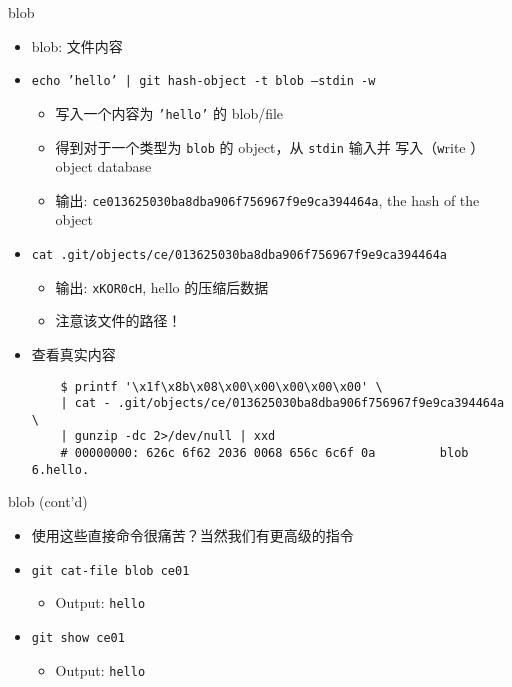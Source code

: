 \documentclass[aspectratio=169]{beamer}
\newcommand{\T}[1]{\texttt{#1}}
\begin{document}
\begin{frame}[fragile]{blob}
  \begin{itemize}
    \item<1-> blob: 文件内容
    \item<2-> \T{echo 'hello' | git hash-object -t blob --stdin -w}\begin{itemize}
      \item 写入一个内容为 \T{'hello'} 的 blob/file
      \item 得到对于一个类型为 \T{blob} 的 object，从 \T{stdin} 输入并 写入（\T{w}rite ） object database
      \item 输出: \T{ce013625030ba8dba906f756967f9e9ca394464a}, the hash of the object
    \end{itemize}
    \item<3-> \T{cat .git/objects/ce/013625030ba8dba906f756967f9e9ca394464a}\begin{itemize}
      \item 输出: \T{xKOR0cH}, hello 的压缩后数据
      \item 注意该文件的路径！
    \end{itemize}
    \item<4-> 查看真实内容 \begin{verbatim}
    $ printf '\x1f\x8b\x08\x00\x00\x00\x00\x00' \
    | cat - .git/objects/ce/013625030ba8dba906f756967f9e9ca394464a \
    | gunzip -dc 2>/dev/null | xxd
    # 00000000: 626c 6f62 2036 0068 656c 6c6f 0a         blob 6.hello.
    \end{verbatim}
  \end{itemize}
\end{frame}

\begin{frame}{blob (cont'd)}
  \begin{itemize}
    \item 使用这些直接命令很痛苦？当然我们有更高级的指令
    \item \T{git cat-file blob ce01}\begin{itemize}
      \item Output: \T{hello}
    \end{itemize}
    \item \T{git show ce01}\begin{itemize}
      \item Output: \T{hello}
    \end{itemize}
  \end{itemize}
\end{frame}
\end{document}

